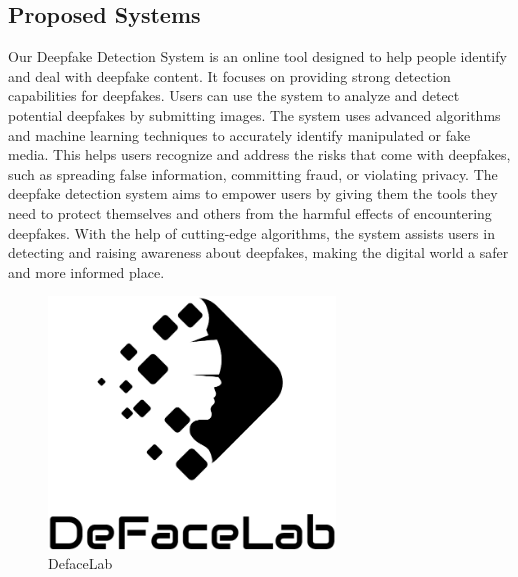 \subsection{Proposed Systems}
Our Deepfake Detection System is an online tool designed to help people identify and deal with deepfake content. It focuses on providing strong detection capabilities for deepfakes. Users can use the system to analyze and detect potential deepfakes by submitting images. The system uses advanced algorithms and machine learning techniques to accurately identify manipulated or fake media. This helps users recognize and address the risks that come with deepfakes, such as spreading false information, committing fraud, or violating privacy. The deepfake detection system aims to empower users by giving them the tools they need to protect themselves and others from the harmful effects of encountering deepfakes. With the help of cutting-edge algorithms, the system assists users in detecting and raising awareness about deepfakes, making the digital world a safer and more informed place.
\begin{figure}[h]
    \centering
    \includegraphics[width= 3in ]{img/logoblack.png}
    \caption{DefaceLab}
\end{figure}
